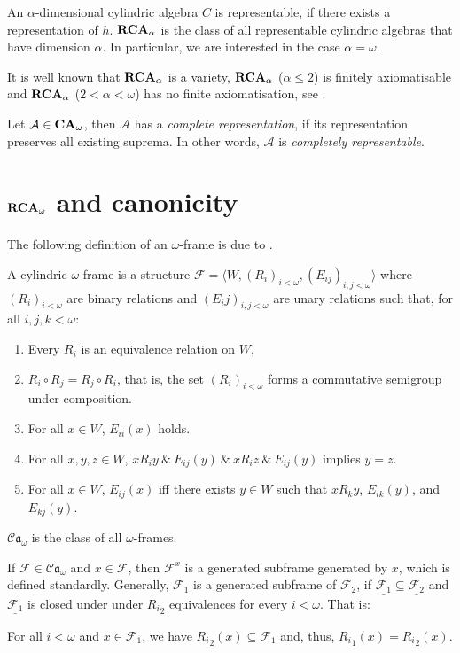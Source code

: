 \documentclass[a4paper]{article}
\theoremstyle{defin}
\theoremstyle{theorem}
\theoremstyle{claim}
\theoremstyle{prop}
\theoremstyle{lemma}
\theoremstyle{fact}
\theoremstyle{ex}
\theoremstyle{col}
\begin{document}
An $\alpha$-dimensional cylindric algebra $C$ is representable, if there exists a representation of $h$.
${\bf RCA}_{\alpha}$ is the class of all representable cylindric algebras that have dimension $\alpha$. In particular, we are interested in the case $\alpha = \omega$.

It is well known that ${\bf RCA}_{\alpha}$ is a variety, ${\bf RCA}_{\alpha}$ ($\alpha \leq 2$) is finitely axiomatisable and ${\bf RCA}_{\alpha}$ ($2 < \alpha < \omega$) has no finite axiomatisation, see \cite{Henkin1988-HENCAP-4}.

Let $\mathcal{A} \in {\bf CA}_{\omega}$, then $\mathcal{A}$ has a \emph{complete representation}, if its representation preserves all existing suprema. In other words, $\mathcal{A}$ is \emph{completely representable}.

\section{${\bf RCA}_{\omega}$ and canonicity}

The following definition of an $\omega$-frame is due to \cite{Venema2013}.
\begin{defin}
  A cylindric $\omega$-frame is a structure $\mathcal{F} = \langle W, (R_i)_{i < \omega}, (E_{ij})_{i, j < \omega} \rangle$ where $(R_i)_{i < \omega}$ are binary relations and $(E_ij)_{i, j < \omega}$ are unary relations such that, for all $i, j, k < \omega$:
  \begin{enumerate}
  \item Every $R_i$ is an equivalence relation on $W$,
  \item $R_i \circ R_j = R_j \circ R_i$, that is, the set $(R_i)_{i < \omega}$ forms a commutative semigroup under composition.
  \item For all $x \in W$, $E_{ii}(x)$ holds.
  \item For all $x, y, z \in W$, $x R_i y \: \& \: E_{ij}(y) \: \& \: x R_i z \: \& \: E_{ij}(y)$ implies $y = z$.
  \item For all $x \in W$, $E_{ij}(x)$ iff there exists $y \in W$ such that $x R_k y$, $E_{ik}(y)$, and $E_{kj}(y)$.
  \end{enumerate}
  $\mathcal{C}\mathfrak{a}_{\omega}$ is the class of all $\omega$-frames.

  If $\mathcal{F} \in \mathcal{C}\mathfrak{a}_{\omega}$ and $x \in \mathcal{F}$, then $\mathcal{F}^{x}$ is a generated subframe generated by $x$, which is defined standardly. Generally, $\mathcal{F}_1$ is a generated subframe of $\mathcal{F}_2$, if $\underline{\mathcal{F}_1} \subseteq \underline{\mathcal{F}_2}$ and $\underline{\mathcal{F}_1}$ is closed under under ${R_i}_2$ equivalences for every $i < \omega$. That is:
  \begin{center}
  For all $i < \omega$ and $x \in \mathcal{F}_1$, we have ${R_i}_2(x) \subseteq \mathcal{F}_1$ and, thus, ${R_i}_1(x) = {R_i}_2(x)$.
  \end{center}
\end{defin}
\end{document}
